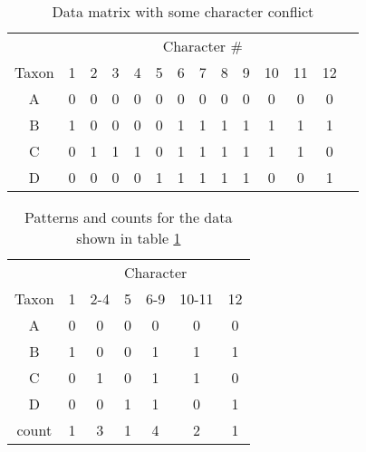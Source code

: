 \documentclass[11pt]{article}
\begin{document}
\begin{table}[htdp]
\begin{center}
\caption{Data matrix with some character conflict}\label{coloredHomoplasy}
\begin{tabular}{|c|c|c|c|c|c|c|c|c|c|c|c|c|c|}
\hline 
 & \multicolumn{12}{c|}{Character \#} \\ 
Taxon &\color{blue} 1 & \color{blue} 2 & \color{blue} 3 & \color{blue} 4 & \color{blue} 5 & \color{green} 6 & \color{green} 7 & \color{green} 8 & \color{green} 9 & \color{red} 10 & \color{red} 11 &  \color{red} 12   \\ 
\hline 
A & \color{blue} 0 & \color{blue} 0 & \color{blue} 0 & \color{blue} 0 & \color{blue} 0 & \color{green} 0 & \color{green} 0 & \color{green} 0 & \color{green} 0 & \color{red} 0 & \color{red} 0 & \color{red} 0  \\
B & \color{blue} 1 & \color{blue} 0 & \color{blue} 0 & \color{blue} 0 & \color{blue} 0 & \color{green} 1 & \color{green} 1 & \color{green} 1 & \color{green} 1 & \color{red} 1 & \color{red} 1 & \color{red} 1 \\
C &    \color{blue} 0 & \color{blue} 1 & \color{blue} 1 & \color{blue} 1 & \color{blue} 0 & \color{green} 1 & \color{green} 1 & \color{green} 1 & \color{green} 1 & \color{red} 1 & \color{red} 1 & \color{red} 0\\
D &    \color{blue} 0 & \color{blue} 0 & \color{blue} 0 & \color{blue} 0 & \color{blue} 1 & \color{green} 1 & \color{green} 1 & \color{green} 1 & \color{green} 1 & \color{red} 0 & \color{red} 0 & \color{red} 1\\
\hline 
\end{tabular}
\end{center}
\end{table}

\begin{table}[htdp]
\begin{center}
\caption{Patterns and counts for the data shown in table \ref{coloredHomoplasy}}\label{compressed}
\begin{tabular}{|c|c|c|c|c|c|c|}
\hline 
 & \multicolumn{6}{c|}{Character } \\ 
Taxon & \color{blue} 1 & \color{blue} 2-4 &  \color{blue} 5 & \color{green} 6-9 & \color{red} 10-11 & \color{red} 12 \\
\hline 
A & \color{blue} 0 & \color{blue} 0 &  \color{blue} 0 & \color{green} 0 & \color{red} 0 & \color{red} 0 \\
B & \color{blue} 1 & \color{blue} 0 &  \color{blue} 0 & \color{green} 1 & \color{red} 1 & \color{red} 1 \\
C & \color{blue} 0 & \color{blue} 1 &  \color{blue} 0 & \color{green} 1 & \color{red} 1 & \color{red} 0 \\
D & \color{blue} 0 & \color{blue} 0 &  \color{blue} 1 & \color{green} 1 & \color{red} 0 & \color{red} 1 \\
\hline
count & 1 & 3 & 1 & 4 & 2 & 1 \\
\hline 
\end{tabular}
\end{center}
\end{table}
\end{document}
